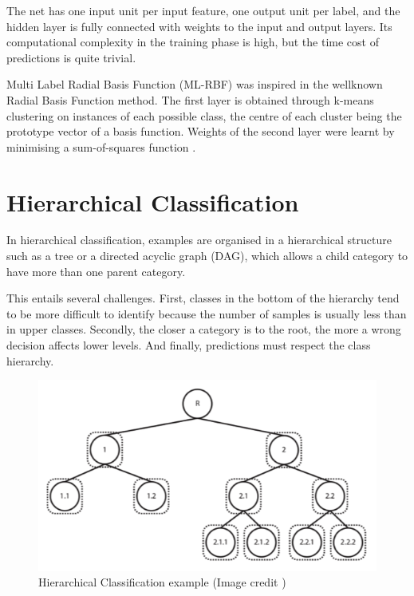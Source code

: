 The net has one input unit per input feature, one output unit
per label, and the hidden layer is fully connected with weights to the input and
output layers. Its computational complexity in the training phase is high, but the
time cost of predictions is quite trivial.


Multi Label Radial Basis Function (ML-RBF) \cite{Zhang2009} was inspired in the wellknown Radial Basis Function method. 
The first layer is obtained through k-means clustering on
instances of each possible class, the centre of each cluster being the prototype
vector of a basis function. Weights of the second layer were learnt by minimising
a sum-of-squares function \cite{Gibaja2014}.


\section{Hierarchical Classification}

In hierarchical classification, examples are organised in a hierarchical
structure such as a tree or a directed acyclic graph (DAG), which allows a child
category to have more than one parent category. 

This entails several challenges.
First, classes in the bottom of the hierarchy tend to be more difficult to identify
because the number of samples is usually less than in upper classes. 
Secondly, the closer a category is to the root, the more a wrong decision affects lower levels. And
finally, predictions must respect the class hierarchy. 

\begin{figure}[th]
    \centering
    \includegraphics[width=1.0\textwidth]{Figures/hierachical.png}
    \decoRule
    \caption[Hierarchical Classification example]{Hierarchical Classification example (Image credit \cite{Silla2011})}
    \label{fig:hierachical}
\end{figure}

